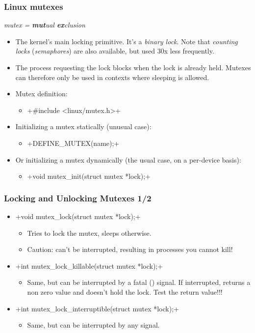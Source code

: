 \begin{frame}[fragile]
  \frametitle{Linux mutexes}
  {\em mutex = {\bf mut}ual {\bf ex}clusion}
  \begin{itemize}
  \item The kernel's main locking primitive. It's a {\em binary lock}.
    Note that {\em counting locks} ({\em semaphores}) are also available,
    but used 30x less frequently.
  \item The process requesting the lock blocks when the lock is
    already held.  Mutexes can therefore only be used in contexts
    where sleeping is allowed.
  \item Mutex definition:
    \begin{itemize}
    \item {}+#include <linux/mutex.h>+
    \end{itemize}
  \item Initializing a mutex statically (unusual case):
    \begin{itemize}
    \item {}+DEFINE_MUTEX(name);+
    \end{itemize}
  \item Or initializing a mutex dynamically (the usual case, on a per-device basis):
    \begin{itemize}
    \item {}+void mutex_init(struct mutex *lock);+
    \end{itemize}
  \end{itemize}
\end{frame}

\begin{frame}[fragile]
  \frametitle{Locking and Unlocking Mutexes 1/2}
  \begin{itemize}
  \item {}+void mutex_lock(struct mutex *lock);+
    \begin{itemize}
    \item Tries to lock the mutex, sleeps otherwise.
    \item Caution: can't be interrupted, resulting in processes you
      cannot kill!
    \end{itemize}
  \item {}+int mutex_lock_killable(struct mutex *lock);+
    \begin{itemize}
    \item Same, but can be interrupted by a fatal () signal. If
      interrupted, returns a non zero value and doesn't hold the
      lock. Test the return value!!!
    \end{itemize}
  \item {}+int mutex_lock_interruptible(struct mutex *lock);+
    \begin{itemize}
    \item Same, but can be interrupted by any signal.
    \end{itemize}
  \end{itemize}
\end{frame}

